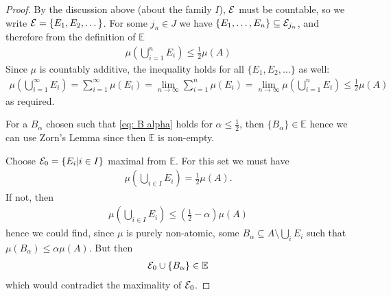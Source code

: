 \begin{proof}
By the discussion above (about the family $I$), $\mathcal{E}$ must be countable, so we write $\mathcal{E}=\{E_{1}, E_{2}, \dots\}$. For some $j_{n}\in J$ we have $\{E_{1}, \dots, E_{n}\}\subseteq \mathcal{E}_{j_{n}}$, and therefore from the definition of $\mathbb{E}$
\begin{align*}
	\mu\left( \bigcup_{i=1}^{n}E_{i} \right) \le \frac{1}{2}\mu(A)
\end{align*}
Since $\mu$ is countably additive, the inequality holds for all $\{E_{1}, E_{2}, \dots\}$ as well:
\begin{align*}
	\mu\left( \bigcup_{i=1}^{\infty}E_{i} \right) = \sum_{i=1}^{\infty}\mu(E_{i}) = \lim_{n\to \infty}\sum_{i=1}^{n}\mu(E_{i})=\lim_{n\to \infty} \mu\left( \bigcup_{i=1}^{n} E_{i} \right) \le \frac{1}{2} \mu(A)
\end{align*}
as required.

For a $B_{\alpha}$ chosen such that \eqref{eq: B alpha} holds for $\alpha \le \frac{1}{2}$, then $\{B_{\alpha}\}\in \mathbb{E}$ hence we can use Zorn's Lemma since then $\mathbb{E}$ is non-empty.

Choose $\mathcal{E}_{0}=\{E_{i} | i\in I\}$ maximal from $\mathbb{E}$. For this set we must have
\begin{align*}
	\mu\left( \bigcup_{i\in I} E_{i} \right)=\frac{1}{2}\mu(A).
\end{align*}
If not, then
\begin{align*}
	\mu\left( \bigcup_{i\in I}E_{i} \right) \le \left( \frac{1}{2} - \alpha \right) \mu(A)
\end{align*}
hence we could find, since $\mu$ is purely non-atomic, some $B_{\alpha}\subseteq A\setminus \bigcup_{i}E_{i}$ such that $\mu(B_{\alpha})\le \alpha \mu(A)$. But then
\begin{align*}
	\mathcal{E}_{0}\cup \{B_{\alpha}\} \in \mathbb{E}
\end{align*}
which would contradict the maximality of $\mathcal{E}_{0}$.
\end{proof}



